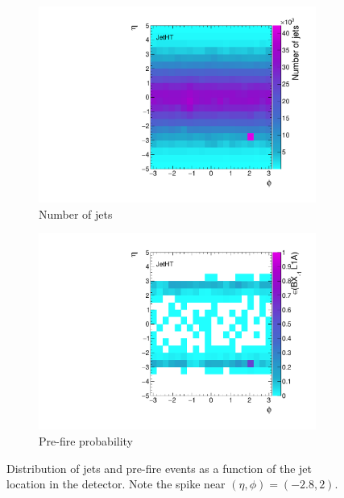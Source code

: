 \begin{figure}[]
    \begin{center}
        \begin{subfigure}[t]{0.49\textwidth}
            \includegraphics[width=\textwidth]{figures/vbf/triggers/JetHT_inclusive_egiso_etaphi_den.pdf}
            \caption{Number of jets}
            \label{fig:vbf:hlta}
        \end{subfigure}
        \begin{subfigure}[t]{0.49\textwidth}
            \includegraphics[width=\textwidth]{figures/vbf/triggers/JetHT_inclusive_egiso_etaphi_ratio.pdf}
            \caption{Pre-fire probability}
            \label{fig:vbf:hltb}
        \end{subfigure}
        \caption{Distribution of jets and pre-fire events as a function of the jet location in the detector.
                 Note the spike near $(\eta,\phi) = (-2.8,2)$. }
        \label{fig:vbf:pre_eff2_etaphi}
    \end{center}
\end{figure}

